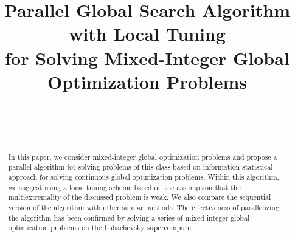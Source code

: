 \documentclass[
11pt,%
tightenlines,%
twoside,%
onecolumn,%
nofloats,%
nobibnotes,%
nofootinbib,%
superscriptaddress,%
noshowpacs,%
centertags]%
{revtex4}
\begin{document}

\title{Parallel Global Search Algorithm with Local Tuning\\ 
for Solving Mixed-Integer Global Optimization Problems}

\author{~}


\author{~}




\begin{abstract} %
In this paper, we consider mixed-integer global optimization problems and propose a parallel algorithm for solving problems of this class based on information-statistical approach for solving continuous global optimization problems. Within this algorithm, we suggest using a local tuning scheme based on the assumption that the multiextremality of the discussed problem is weak. 
We also compare the sequential version of the algorithm with other similar methods.
The effectiveness of parallelizing the algorithm has been confirmed by solving a series of mixed-integer global optimization problems on the Lobachevsky supercomputer.
\end{abstract}



\maketitle
\end{document}
